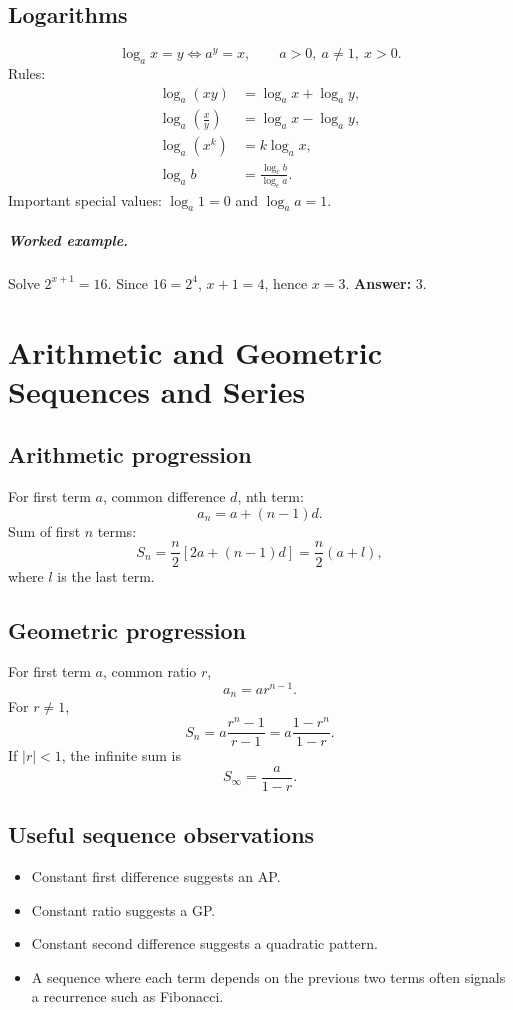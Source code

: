 \documentclass[12pt,a4paper,oneside]{book}
\newcommand{\ans}[1]{\textbf{Answer:} #1}
\newcommand{\q}[2]{\paragraph{#1} #2}
\begin{document}
\section{Logarithms}
\[\log_a x=y\iff a^y=x,\qquad a>0,\ a\ne1,\ x>0.\]
Rules:
\begin{align*}
\log_a(xy)&=\log_a x+\log_a y,\\
\log_a\left(\frac xy\right)&=\log_a x-\log_a y,\\
\log_a(x^k)&=k\log_a x,\\
\log_a b&=\frac{\log_c b}{\log_c a}.
\end{align*}
Important special values: \(\log_a1=0\) and \(\log_a a=1\).

\q{Worked example.}{Solve \(2^{x+1}=16\).}
Since \(16=2^4\), \(x+1=4\), hence \(x=3\).
\ans{3.}

\chapter[AP, GP and Series]{Arithmetic and Geometric Sequences and Series}
\section{Arithmetic progression}
For first term \(a\), common difference \(d\), nth term:
\[a_n=a+(n-1)d.\]
Sum of first \(n\) terms:
\[S_n=\frac n2[2a+(n-1)d]=\frac n2(a+l),\]
where \(l\) is the last term.

\section{Geometric progression}
For first term \(a\), common ratio \(r\),
\[a_n=ar^{n-1}.\]
For \(r\ne1\),
\[S_n=a\frac{r^n-1}{r-1}=a\frac{1-r^n}{1-r}.\]
If \(|r|<1\), the infinite sum is
\[S_\infty=\frac a{1-r}.\]

\section{Useful sequence observations}
\begin{itemize}
\item Constant first difference suggests an AP.
\item Constant ratio suggests a GP.
\item Constant second difference suggests a quadratic pattern.
\item A sequence where each term depends on the previous two terms often signals a recurrence such as Fibonacci.
\end{itemize}
\end{document}
